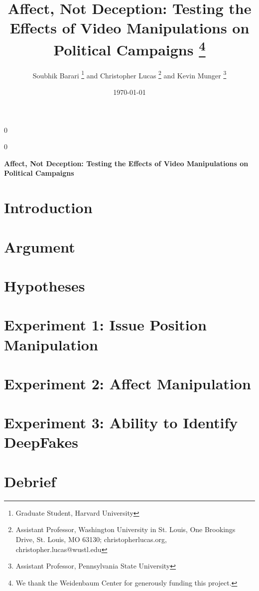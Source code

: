 \documentclass[12pt]{article}
\newcommand{\blind}{0}
\begin{document}
\def\spacingset#1{\renewcommand{\baselinestretch}%
{#1}\small\normalsize} \spacingset{1}


\date{\today}

\blind { \title{\bf Affect, Not Deception: Testing the Effects of Video Manipulations on Political Campaigns
    \thanks{We thank the Weidenbaum Center for generously funding this project.}}
  \author{Soubhik Barari
    \thanks{Graduate Student, Harvard University}
    and
    Christopher Lucas
    \thanks{Assistant Professor, Washington
      University in St. Louis, One Brookings Drive, St. Louis, MO
      63130; christopherlucas.org, christopher.lucas@wustl.edu}
    and
    Kevin Munger
    \thanks{Assistant Professor, Pennsylvania State University}
  }
  \maketitle } \fi

\blind
{
  \bigskip
  \bigskip
  \bigskip
  \begin{center}
    {\LARGE\bf Affect, Not Deception: Testing the Effects of Video Manipulations on Political Campaigns}
\end{center}
  \medskip
} \fi

\bigskip
\begin{abstract}

\end{abstract}

\vspace{1em}
\begin{center}
\end{center}

\newpage
\spacingset{2} 

\section{Introduction}


\section{Argument}


\section{Hypotheses}


\section{Experiment 1: Issue Position Manipulation}


\section{Experiment 2: Affect Manipulation}


\section{Experiment 3: Ability to Identify DeepFakes}


\section{Debrief}


\printbibliography
\end{document}
